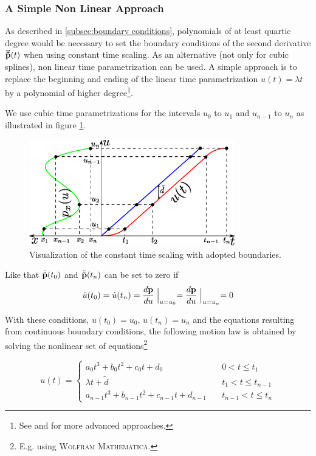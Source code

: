 \subsubsection{A Simple Non Linear Approach}
As described in \ref{subsec:boundary conditions}, polynomials of at least quartic degree would be necessary to set the boundary conditions of the second derivative ${\bf \ddot{\tilde{p}}}(t)$ when using constant time scaling. As an alternative (not only for cubic splines), non linear time parametrization can be used. A simple approach is to replace the beginning and ending of the linear time parametrization $u(t)=\lambda t$ by a polynomial of higher degree\footnote{See \cite{doessegger} and \cite{biagiotti} for more advanced approaches.}.

We use cubic time parametrizations for the intervals $u_0$ to $u_1$ and $u_{n-1}$ to $u_n$ as illustrated in figure \ref{fig:non_linear_time}.

\begin{figure}[h]
    \centering
    \includegraphics[width = 0.8\textwidth]{graphics/constantTimeScaling_adoptedBoundaries.eps}
    \caption{Visualization of the constant time scaling with adopted boundaries.}
    \label{fig:non_linear_time}
\end{figure}

Like that $\ddot{\tilde{{\bf p}}}(t_0)$ and $\ddot{\tilde{{\bf p}}}(t_n)$ can be set to zero if 
\begin{equation*}
\dot{u}(t_0)=\dot{u}(t_n)=\frac{d{\bf p}}{du}\Bigm|_{u=u_0}=\frac{d{\bf p}}{du}\Bigm|_{u=u_n}=0
\end{equation*}

With these conditions, $u(t_0)=u_0$, $u(t_n)=u_n$ and the equations resulting from continuous boundary conditions, the following motion law is obtained by solving the nonlinear set of equations\footnote{E.g. using \textsc{Wolfram Mathematica}.}

\begin{equation}
u(t) =
\begin{cases}
a_0 t^3 + b_0 t^2 + c_0 t + d_0 & \quad 0 < t \leq t_1\\
\lambda t + \tilde{d} & \quad t_1 < t \leq t_{n-1}\\
a_{n-1} t^3 + b_{n-1} t^2 + c_{n-1} t + d_{n-1} & \quad t_{n-1} < t \leq t_n
\end{cases}
\end{equation}

